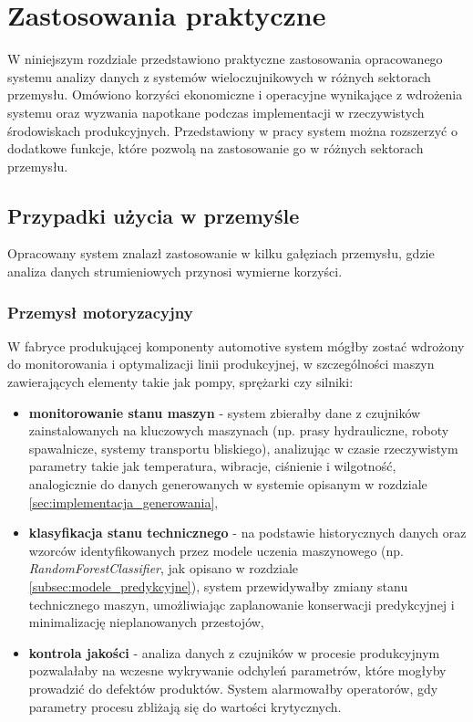\section{Zastosowania praktyczne}
\label{sec:zastosowania_praktyczne}

W niniejszym rozdziale przedstawiono praktyczne zastosowania opracowanego systemu analizy danych z
systemów wieloczujnikowych w różnych sektorach przemysłu. Omówiono korzyści ekonomiczne i operacyjne wynikające z wdrożenia systemu
oraz wyzwania napotkane podczas implementacji w rzeczywistych środowiskach produkcyjnych. Przedstawiony w pracy system można rozszerzyć o dodatkowe funkcje, które pozwolą na zastosowanie go w różnych sektorach przemysłu.

\subsection{Przypadki użycia w przemyśle}
\label{subsec:przypadki_uzycia}

Opracowany system znalazł zastosowanie w kilku gałęziach przemysłu, gdzie analiza danych strumieniowych przynosi wymierne korzyści.

\subsubsection{Przemysł motoryzacyjny}
\label{subsubsec:przemysl_motoryzacyjny}

W fabryce produkującej komponenty automotive system mógłby zostać wdrożony do monitorowania i optymalizacji linii produkcyjnej, w szczególności maszyn zawierających elementy takie jak pompy, sprężarki czy silniki:

\begin{itemize}
    \item \textbf{monitorowanie stanu maszyn} - system zbierałby dane z czujników zainstalowanych na kluczowych maszynach (np. prasy hydrauliczne, roboty spawalnicze, systemy transportu bliskiego),
    analizując w czasie rzeczywistym parametry takie jak temperatura, wibracje, ciśnienie i wilgotność, analogicznie do danych generowanych w systemie opisanym w rozdziale \ref{sec:implementacja_generowania},
    \item \textbf{klasyfikacja stanu technicznego} - na podstawie historycznych danych oraz wzorców identyfikowanych przez modele uczenia maszynowego (np. \textit{RandomForestClassifier}, jak opisano w rozdziale \ref{subsec:modele_predykcyjne}), system przewidywałby zmiany stanu technicznego maszyn,
    umożliwiając zaplanowanie konserwacji predykcyjnej i minimalizację nieplanowanych przestojów,
    \item \textbf{kontrola jakości} - analiza danych z czujników w procesie produkcyjnym pozwalałaby na wczesne wykrywanie odchyleń parametrów, które mogłyby prowadzić do defektów
    produktów. System alarmowałby operatorów, gdy parametry procesu zbliżają się do wartości krytycznych.
\end{itemize}

